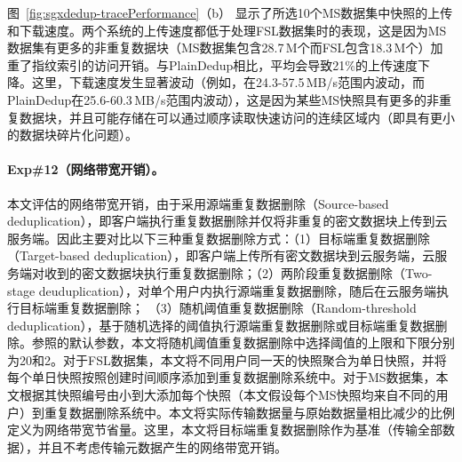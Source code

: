图~\ref{fig:sgxdedup-tracePerformance}（b） 显示了所选10个MS数据集中快照的上传和下载速度。两个系统的上传速度都低于处理FSL数据集时的表现，这是因为MS数据集有更多的非重复数据块（MS数据集包含28.7\,M个而FSL包含18.3\,M个）加重了指纹索引的访问开销。与PlainDedup相比，\sysnameS 平均会导致21\%的上传速度下降。这里，下载速度发生显著波动（例如，\sysnameS 在24.3-57.5\,MB/s范围内波动，而PlainDedup在25.6-60.3\,MB/s范围内波动），这是因为某些MS快照具有更多的非重复数据块，并且可能存储在可以通过顺序读取快速访问的连续区域内（即具有更小的数据块碎片化问题\cite{lillibridge13}）。

\paragraph*{Exp\#12（网络带宽开销）。} 本文评估\sysnameS 的网络带宽开销，由于\sysnameS 采用源端重复数据删除（Source-based deduplication），即客户端执行重复数据删除并仅将非重复的密文数据块上传到云服务端。因此主要对比以下三种重复数据删除方式：（1）目标端重复数据删除（Target-based deduplication），即客户端上传所有密文数据块到云服务端，云服务端对收到的密文数据块执行重复数据删除；（2）两阶段重复数据删除（Two-stage deuduplication）\cite{li15}，对单个用户内执行源端重复数据删除，随后在云服务端执行目标端重复数据删除； （3）随机阈值重复数据删除（Random-threshold deduplication）\cite{harnik2010side}，基于随机选择的阈值执行源端重复数据删除或目标端重复数据删除。参照\cite{harnik2010side}的默认参数，本文将随机阈值重复数据删除中选择阈值的上限和下限分别为20和2。对于FSL数据集，本文将不同用户同一天的快照聚合为单日快照，并将每个单日快照按照创建时间顺序添加到重复数据删除系统中。对于MS数据集，本文根据其快照编号由小到大添加每个快照（本文假设每个MS快照均来自不同的用户）到重复数据删除系统中。本文将实际传输数据量与原始数据量相比减少的比例定义为网络带宽节省量。这里，本文将目标端重复数据删除作为基准（传输全部数据），并且不考虑传输元数据产生的网络带宽开销。

